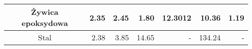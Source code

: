 \begin{table}[H]
{\begin{tabular}{|c|r|r|r|r|r|r|}
    Żywica epoksydowa                                                            & 2.35                                                                                                      & 2.45                                                                                 & 1.80                                                                                                 & 12.3012                         & 10.36                                                                             & 1.19                                                                              \\ \hline
    Stal                                                                         & 2.38                                                                                                      & 3.85                                                                                 & 14.65                                                                                                & -                               & 134.24                                                                            & -                                                                                 \\ \hline
    \end{tabular}%
    }
    \end{table}